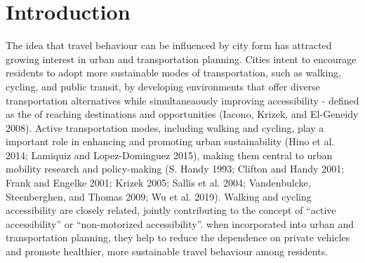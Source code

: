 \documentclass[preprint, 3p,
authoryear]{elsarticle} %
\begin{document}
\section{Introduction}\label{introduction}

The idea that travel behaviour can be influenced by city form has
attracted growing interest in urban and transportation planning. Cities
intent to encourage residents to adopt more sustainable modes of
transportation, such as walking, cycling, and public transit, by
developing environments that offer diverse transportation alternatives
while simultaneaously improving accessibility - defined as the of
reaching destinations and opportunities (Iacono, Krizek, and El-Geneidy
2008). Active transportation modes, including walking and cycling, play
a important role in enhancing and promoting urban sustainability (Hino
et al. 2014; Lamiquiz and Lopez-Dominguez 2015), making them central to
urban mobility research and policy-making (S. Handy 1993; Clifton and
Handy 2001; Frank and Engelke 2001; Krizek 2005; Sallis et al. 2004;
Vandenbulcke, Steenberghen, and Thomas 2009; Wu et al. 2019). Walking
and cycling accessibility are closely related, jointly contributing to
the concept of ``active accessibility'' or ``non-motorized
accessibility''. when incorporated into urban and transportation
planning, they help to reduce the dependence on private vehicles and
promote healthier, more sustainable travel behaviour among residents.
\end{document}
